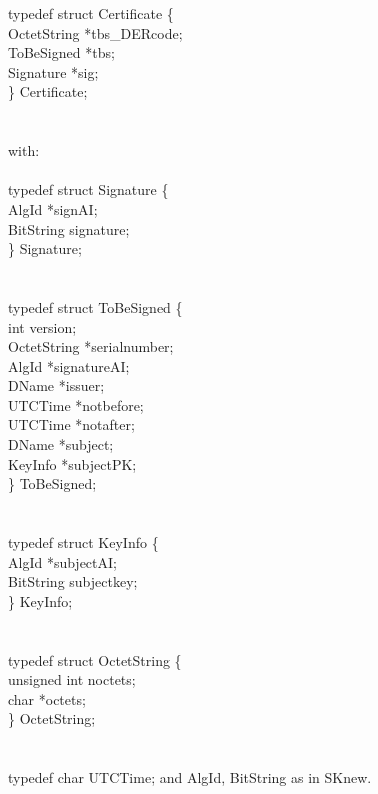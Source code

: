 {\small
\bvtab
\4      typedef struct Certificate \{  \\
\6              OctetString   \4 *tbs\_DERcode; \\
\6              ToBeSigned    \4 *tbs; \\
\6              Signature     \4 *sig; \\
\4      \} Certificate;  \\ \\ \\
with: \\ \\
\4      typedef struct Signature \{  \\
\6              AlgId         \3 *signAI; \\
\6              BitString     \3 signature; \\
\4 \}           Signature;  \\ \\ \\
\4      typedef struct ToBeSigned \{ \\
\6              int           \3 version; \\
\6              OctetString   \3 *serialnumber; \\
\6              AlgId         \3 *signatureAI; \\
\6              DName          \3 *issuer; \\
\6              UTCTime       \3 *notbefore; \\
\6              UTCTime       \3 *notafter; \\
\6              DName          \3 *subject; \\
\6              KeyInfo       \3 *subjectPK; \\
\4      \} ToBeSigned;  \\ \\ \\
\4      typedef struct KeyInfo \{  \\
\6              AlgId         \3 *subjectAI; \\
\6              BitString     \3 subjectkey; \\
\4      \} KeyInfo; \\ \\ \\
\4      typedef struct OctetString \{ \\
\6              unsigned int  \3 noctets; \\
\6              char          \3 *octets; \\
\4      \} OctetString;  \\ \\ \\
\4      typedef char UTCTime;
\evtab
}
and AlgId, BitString as in SKnew.

